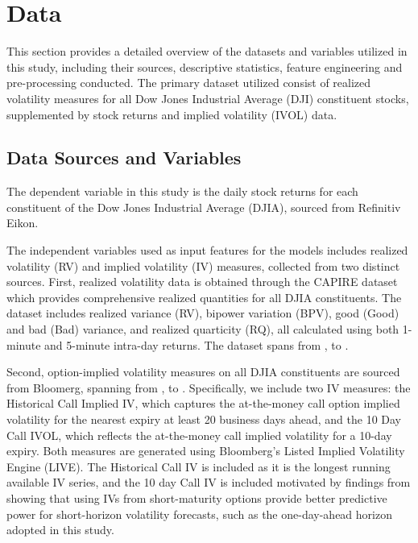 \section{Data}
\label{sec:4_data}
This section provides a detailed overview of the datasets and variables utilized in this study, including their sources, descriptive statistics, feature engineering and pre-processing conducted. The primary dataset utilized consist of realized volatility measures for all Dow Jones Industrial Average (DJI) constituent stocks, supplemented by stock returns and implied volatility (IVOL) data.   


\subsection{Data Sources and Variables}
\label{sec:data_sources}

The dependent variable in this study is the daily stock returns for each constituent of the Dow Jones Industrial Average (DJIA), sourced from Refinitiv Eikon. 

The independent variables used as input features for the models includes realized volatility (RV) and implied volatility (IV) measures, collected from two distinct sources. First, realized volatility data is obtained through the CAPIRE dataset which provides comprehensive realized quantities for all DJIA constituents. The dataset includes realized variance (RV), bipower variation (BPV), good (Good) and bad (Bad) variance, and realized quarticity (RQ), all calculated using both 1-minute and 5-minute intra-day returns. The dataset spans from \datasetDJIStart, to \datasetDJIEnd. 

Second, option-implied volatility measures on all DJIA constituents are sourced from Bloomerg, spanning from \datasetBloombergStart, to \datasetBloombergEnd. Specifically, we include two IV measures: the Historical Call Implied IV, which captures the at-the-money call option implied volatility for the nearest expiry at least 20 business days ahead, and the 10 Day Call IVOL, which reflects the at-the-money call implied volatility for a 10-day expiry. Both measures are generated using Bloomberg’s Listed Implied Volatility Engine (LIVE). The Historical Call IV is included as it is the longest running available IV series, and the 10 day Call IV is included motivated by findings from \textcite{Plhal2021} showing that using IVs from short-maturity options provide better predictive power for short-horizon volatility forecasts, such as the one-day-ahead horizon adopted in this study.

